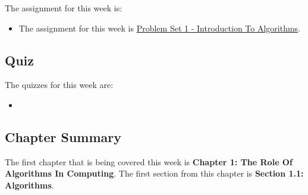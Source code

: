 The assignment for this week is:

\begin{itemize}
    \item The assignment for this week is \href{https://github.com/QuantumCompiler/CU/tree/main/CSPB%203104%20-%20Algorithms/CSPB%203104%20-%20Assignments/CSPB%203104%20-%20Problem%20Sets/CSPB%203104%20-%20Problem%20Set%201%20-%20Introduction%20To%20Algorithms}{Problem Set 1 - Introduction To Algorithms}. 
\end{itemize}

\subsection{Quiz}

The quizzes for this week are:

\begin{itemize}
    \item {} \textbullet {} 
\end{itemize}

\subsection{Chapter Summary}

The first chapter that is being covered this week is \textbf{Chapter 1: The Role Of Algorithms In Computing}. The first section from this chapter is \textbf{Section 1.1: Algorithms}.

